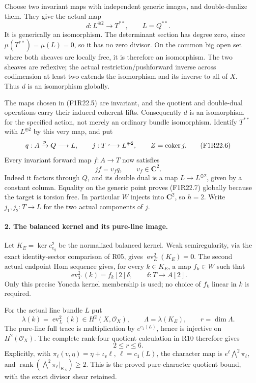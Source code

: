 Choose two invariant maps with independent generic
images, and double-dualize them. They give the actual
map
\[
                      d:L^{\oplus2}\longrightarrow T^{**},
                                 \qquad L=Q^{**}.
 \tag{F1R22.5}
\]
It is generically an isomorphism. The determinant
section has degree zero, since $\mu(T^{**})=\mu(L)=0$,
so it has no zero divisor. On the common big open
set where both sheaves are locally free, it is
therefore an isomorphism. The two sheaves are reflexive;
the actual restriction/pushforward inverse across
codimension at least two extends the isomorphism
and its inverse to all of $X$. Thus $d$ is an
isomorphism globally.

The maps chosen in (F1R22.5) are invariant, and the
quotient and double-dual operations carry their
induced coherent lifts. Consequently $d$ is an
isomorphism for the specified action, not merely
an ordinary bundle isomorphism. Identify $T^{**}$
with $L^{\oplus2}$ by this very map, and put
\[
       q:A\xrightarrow{p}Q\longrightarrow L,\qquad
       j:T\lhook\joinrel\longrightarrow L^{\oplus2},\qquad
       Z=\operatorname{coker}j.
 \tag{F1R22.6}
\]
Every invariant forward map $f:A\to T$ now satisfies
\[
                           j f=v_f q,
                                   \qquad v_f\in\mathbf C^2.
 \tag{F1R22.7}
\]
Indeed it factors through $Q$, and its double dual
is a map $L\to L^{\oplus2}$, given by a constant
column. Equality on the generic point proves
(F1R22.7) globally because the target is torsion free.
In particular $W$ injects into $\mathbf C^2$, so
$h=2$. Write $j_1,j_2:T\to L$ for the two actual
components of $j$.

\paragraph{2. The balanced kernel and its pure-line image.}
Let $K_E=\ker c^2_{v_q}$ be the normalized balanced
kernel. Weak semiregularity, via the exact identity-sector
comparison of R05, gives
$\operatorname{ev}_E^2(K_E)=0$. The second actual
endpoint Hom sequence gives, for every $k\in K_E$,
a map $f_k\in W$ such that
\[
                       \operatorname{ev}_T^2(k)=f_k[2]\delta,
                        \qquad \delta:T\longrightarrow A[2].
 \tag{F1R22.8}
\]
Only this precise Yoneda kernel membership is used;
no choice of $f_k$ linear in $k$ is required.

For the actual line bundle $L$ put
\[
 \lambda(k)=\operatorname{ev}_L^2(k)\in H^2(X,\mathcal O_X),
 \qquad \Lambda=\lambda(K_E),\qquad r=\dim\Lambda.
 \tag{F1R22.9}
\]
The pure-line full trace is multiplication by
$e^{c_1(L)}$, hence is injective on $H^2(\mathcal O_X)$.
The complete rank-four quotient calculation in R10
therefore gives
\[
                                  2\le r\le6.
 \tag{F1R22.10}
\]
Explicitly, with
$\pi_\ell(v,\eta)=\eta+\iota_v\ell$, $\ell=c_1(L)$,
the character map is
$e^\ell\bigwedge^2\pi_\ell$, and
$\operatorname{rank}(\bigwedge^2\pi_\ell|_{K_E})\ge2$.
This is the proved pure-character quotient bound,
with the exact divisor shear retained.

